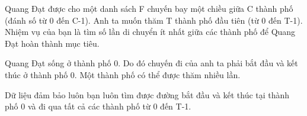 Quang Đạt được cho một danh sách F chuyến bay một chiều giữa C thành phố (đánh số từ 0 đến C-1). Anh ta muốn thăm T thành phố đầu tiên (từ 0 đến T-1). Nhiệm vụ của bạn là tìm số lần di chuyển ít nhất giữa các thành phố để Quang Đạt hoàn thành mục tiêu.  

   Quang Đạt sống ở thành phố 0. Do đó chuyến đi của anh ta phải bắt đầu và kết thúc ở thành phố 0. Một thành phố có thể được thăm nhiều lần.  

   Dữ liệu đảm bảo luôn bạn luôn tìm được đường bắt đầu và kết thúc tại thành phố 0 và đi qua tất cả các thành phố từ 0 đến T-1.  

\